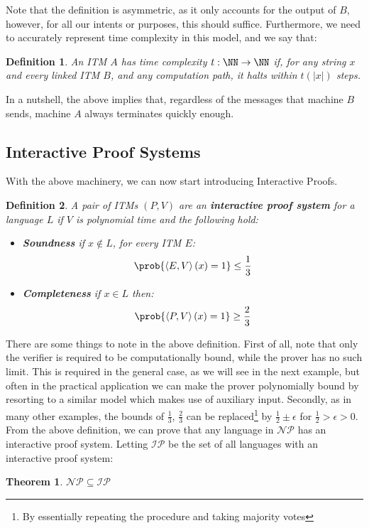 \documentclass{article}
\newtheorem{theorem}{Theorem}
\newtheorem{definition}{Definition}
\begin{document}
Note that the definition is asymmetric, as it only accounts for the output of $B$, however, for all our intents or purposes, this should suffice. 
Furthermore, we need to accurately represent time complexity in this model, and we say that:

\begin{definition}
An ITM $A$ has time complexity $t: \NN \to \NN$ if, for any string $x$ and every linked ITM $B$, and any computation path, it halts within $t(|x|)$ steps. 
\end{definition}

In a nutshell, the above implies that, regardless of the messages that machine $B$ sends, machine $A$ always terminates quickly enough. 

\subsection{Interactive Proof Systems}
With the above machinery, we can now start introducing Interactive Proofs. 
\begin{definition}
A pair of ITMs $(P, V)$ are an \textbf{interactive proof system} for a language $L$ if $V$ is polynomial time and the following hold:
\begin{itemize}
    \item \textbf{Soundness} if $x \notin L$, for every ITM $E$:
        \[ \prob{\left<E,V \right>(x) = 1} \leq \frac{1}{3} \]
    \item \textbf{Completeness} if $x \in L$ then:
        \[ \prob{\left<P, V\right>(x) = 1 } \geq \frac{2}{3}\]
\end{itemize}
\end{definition}
There are some things to note in the above definition. First of all, note that only the verifier is required to be computationally bound, while the prover has no such limit. This is required in the general case, as we will see in the next example, but often in the practical application we can make the prover polynomially bound by resorting to a similar model which makes use of auxiliary input. Secondly, as in many other examples, the bounds of $\frac{1}{3}$, $\frac{2}{3}$ can be replaced\footnote{By essentially repeating the procedure and taking majority votes} by $\frac{1}{2} \pm \epsilon$ for $\frac{1}{2} > \epsilon > 0$. From the above definition, we can prove that any language in $\mathcal{NP}$ has an interactive proof system. Letting $\mathcal{IP}$ be the set of all languages with an interactive proof system:
\begin{theorem}
$\mathcal{NP} \subseteq \mathcal{IP}$ 
\end{theorem}
\end{document}
